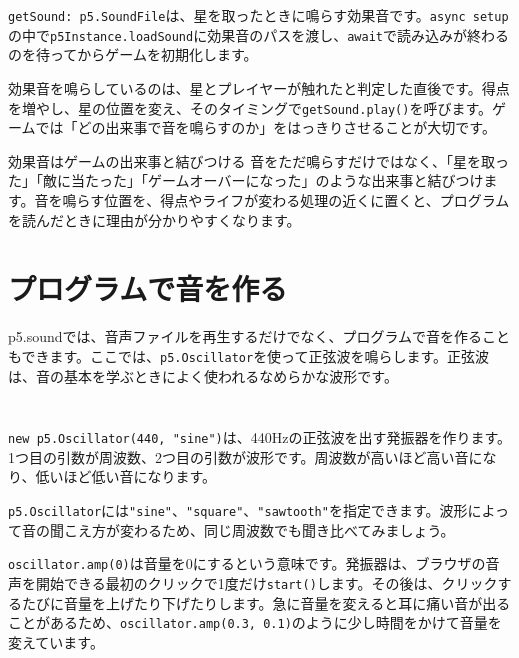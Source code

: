 \texttt{getSound: p5.SoundFile}は、星を取ったときに鳴らす効果音です。\texttt{async setup}の中で\texttt{p5Instance.loadSound}に効果音のパスを渡し、\texttt{await}で読み込みが終わるのを待ってからゲームを初期化します。

効果音を鳴らしているのは、星とプレイヤーが触れたと判定した直後です。得点を増やし、星の位置を変え、そのタイミングで\texttt{getSound.play()}を呼びます。ゲームでは「どの出来事で音を鳴らすのか」をはっきりさせることが大切です。

\begin{pointbox}{効果音はゲームの出来事と結びつける}
音をただ鳴らすだけではなく、「星を取った」「敵に当たった」「ゲームオーバーになった」のような出来事と結びつけます。音を鳴らす位置を、得点やライフが変わる処理の近くに置くと、プログラムを読んだときに理由が分かりやすくなります。
\end{pointbox}

\section{プログラムで音を作る}

p5.soundでは、音声ファイルを再生するだけでなく、プログラムで音を作ることもできます。ここでは、\texttt{p5.Oscillator}を使って正弦波を鳴らします。正弦波は、音の基本を学ぶときによく使われるなめらかな波形です。

\begin{listing}[htbp]
\inputminted[firstline=1,lastline=23]{ts}{typescript-p5/listings/chapter17/oscillator.ts}
\caption{発振器を準備する（\texttt{chapter17/oscillator.ts}）}
\label{lst:chapter17-oscillator-setup}
\end{listing}

\begin{listing}[htbp]
\inputminted[firstline=25,lastline=68]{ts}{typescript-p5/listings/chapter17/oscillator.ts}
\caption{マウス位置で周波数を変える（\texttt{chapter17/oscillator.ts}）}
\label{lst:chapter17-oscillator-control}
\end{listing}

\texttt{new p5.Oscillator(440, "sine")}は、440Hzの正弦波を出す発振器を作ります。1つ目の引数が周波数、2つ目の引数が波形です。周波数が高いほど高い音になり、低いほど低い音になります。

\texttt{p5.Oscillator}には\texttt{"sine"}、\texttt{"square"}、\texttt{"sawtooth"}を指定できます。波形によって音の聞こえ方が変わるため、同じ周波数でも聞き比べてみましょう。

\texttt{oscillator.amp(0)}は音量を0にするという意味です。発振器は、ブラウザの音声を開始できる最初のクリックで1度だけ\texttt{start()}します。その後は、クリックするたびに音量を上げたり下げたりします。急に音量を変えると耳に痛い音が出ることがあるため、\texttt{oscillator.amp(0.3, 0.1)}のように少し時間をかけて音量を変えています。

